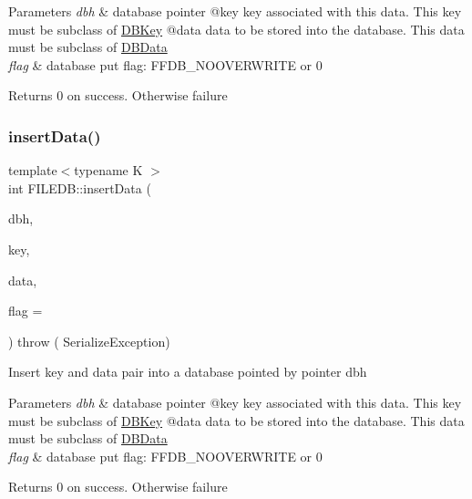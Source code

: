 \begin{DoxyParams}{Parameters}
{\em dbh} & database pointer @key key associated with this data. This key must be subclass of \mbox{\hyperlink{classFILEDB_1_1DBKey}{D\+B\+Key}} @data data to be stored into the database. This data must be subclass of \mbox{\hyperlink{classFILEDB_1_1DBData}{D\+B\+Data}} \\
\hline
{\em flag} & database put flag\+: F\+F\+D\+B\+\_\+\+N\+O\+O\+V\+E\+R\+W\+R\+I\+TE or 0\\
\hline
\end{DoxyParams}
\begin{DoxyReturn}{Returns}
0 on success. Otherwise failure 
\end{DoxyReturn}
\mbox{\label{namespaceFILEDB_aeadc0ee930c4a7b2ddae220799008bd6}} 
\subsubsection{\texorpdfstring{insertData()}{insertData()}\hspace{0.1cm}{\footnotesize\ttfamily [2/2]}}
{\footnotesize\ttfamily template$<$typename K $>$ \\
int F\+I\+L\+E\+D\+B\+::insert\+Data (\begin{DoxyParamCaption}\item[{\mbox{\hyperlink{other__libs_2filedb_2filehash_2ffdb__db_8h_a0b27b956926453a7a8141ea8e10f0df8}{F\+F\+D\+B\+\_\+\+DB}} $\ast$}]{dbh,  }\item[{const K \&}]{key,  }\item[{const std\+::string \&}]{data,  }\item[{unsigned int}]{flag = {} }\end{DoxyParamCaption}) throw ( Serialize\+Exception) }

Insert key and data pair into a database pointed by pointer dbh


\begin{DoxyParams}{Parameters}
{\em dbh} & database pointer @key key associated with this data. This key must be subclass of \mbox{\hyperlink{classFILEDB_1_1DBKey}{D\+B\+Key}} @data data to be stored into the database. This data must be subclass of \mbox{\hyperlink{classFILEDB_1_1DBData}{D\+B\+Data}} \\
\hline
{\em flag} & database put flag\+: F\+F\+D\+B\+\_\+\+N\+O\+O\+V\+E\+R\+W\+R\+I\+TE or 0\\
\hline
\end{DoxyParams}
\begin{DoxyReturn}{Returns}
0 on success. Otherwise failure 
\end{DoxyReturn}
\mbox{\label{namespaceFILEDB_a25ba56393bd11f7e104de43478a253de}} 
